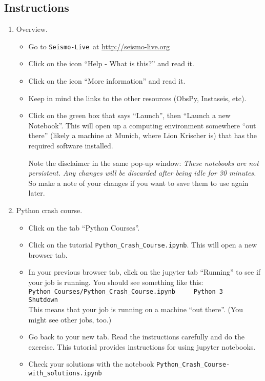 \documentclass[11pt,titlepage,fleqn]{article}
\newcommand{\slive}{{\tt Seismo-Live}}
\newcommand{\sliveurl}{\url{http://seismo-live.org}}
\begin{document}

\pagebreak
\subsection*{Instructions}

\begin{enumerate}
\item Overview.
\begin{itemize}
\item Go to \slive\ at \sliveurl\
\item Click on the icon ``Help - What is this?'' and read it.
\item Click on the icon ``More information'' and read it.
\item Keep in mind the links to the other resources (ObsPy, Instaseis, etc).
\item Click on the green box that says ``Launch'', then ``Launch a new Notebook''. This will open up a computing environment somewhere ``out there'' (likely a machine at Munich, where Lion Krischer is) that has the required software installed.

Note the disclaimer in the same pop-up window: {\em These notebooks are not persistent. Any changes will be discarded after being idle for 30 minutes.} So make a note of your changes if you want to save them to use again later.
\end{itemize}

\item Python crash course.
\begin{itemize}
\item Click on the tab ``Python Courses''.
\item Click on the tutorial \verb+Python_Crash_Course.ipynb+. This will open a new browser tab.
\item In your previous browser tab, click on the jupyter tab ``Running'' to see if your job is running. You should see something like this: \\
\verb+Python Courses/Python_Crash_Course.ipynb     Python 3   Shutdown+ \\
This means that your job is running on a machine ``out there''. (You might see other jobs, too.)

\item Go back to your new tab. Read the instructions carefully and do the exercise.
This tutorial provides instructions for using jupyter notebooks.

\item Check your solutions with the notebook \verb+Python_Crash_Course-with_solutions.ipynb+
\end{itemize}


\end{enumerate}
\end{document}
